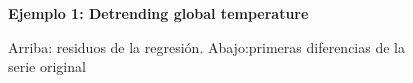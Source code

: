 \begin{figure}[p]
	\centering
	\textbf{Ejemplo 1: Detrending global temperature}\par\medskip
	\caption{Arriba: residuos de la regresión. Abajo:primeras diferencias de la serie original}\label{fig3}
\end{figure}




